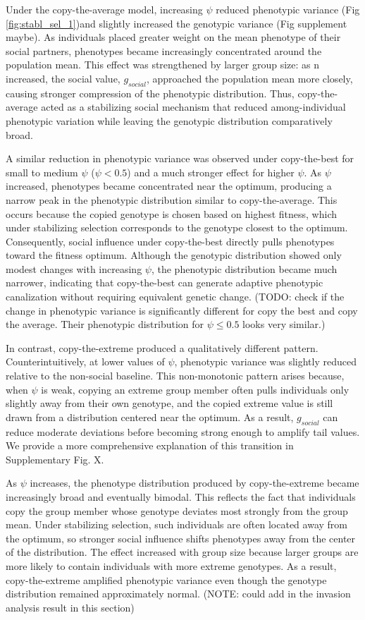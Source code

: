 \documentclass{article}
\begin{document}
Under the copy-the-average model, increasing $\psi$ reduced phenotypic variance (Fig \ref{fig:stabl_sel_1})and slightly increased the genotypic variance (Fig supplement maybe). As individuals placed greater weight on the mean phenotype of their social partners, phenotypes became increasingly concentrated around the population mean. This effect was strengthened by larger group size: as n increased, the social value, $g_{social}$, approached the population mean more closely, causing stronger compression of the phenotypic distribution. Thus, copy-the-average acted as a stabilizing social mechanism that reduced among-individual phenotypic variation while leaving the genotypic distribution comparatively broad.

A similar reduction in phenotypic variance was observed under copy-the-best for small to medium $\psi$ ($\psi < 0.5$) and a much stronger effect for higher $\psi$. As $\psi$ increased, phenotypes became concentrated near the optimum, producing a narrow peak in the phenotypic distribution similar to copy-the-average. This occurs because the copied genotype is chosen based on highest fitness, which under stabilizing selection corresponds to the genotype closest to the optimum. Consequently, social influence under copy-the-best directly pulls phenotypes toward the fitness optimum. Although the genotypic distribution showed only modest changes with increasing $\psi$, the phenotypic distribution became much narrower, indicating that copy-the-best can generate adaptive phenotypic canalization without requiring equivalent genetic change. (TODO: check if the change in phenotypic variance is significantly different for copy the best and copy the average. Their phenotypic distribution for $\psi \leq 0.5$ looks very similar.)

In contrast, copy-the-extreme produced a qualitatively different pattern. Counterintuitively, at lower values of $\psi$, phenotypic variance was slightly reduced relative to the non-social baseline. This non-monotonic pattern arises because, when $\psi$ is weak, copying an extreme group member often pulls individuals only slightly away from their own genotype, and the copied extreme value is still drawn from a distribution centered near the optimum. As a result, $g_{social}$ can reduce moderate deviations before becoming strong enough to amplify tail values. We provide a more comprehensive explanation of this transition in Supplementary Fig. X.

As $\psi$ increases, the phenotype distribution produced by copy-the-extreme became increasingly broad and eventually bimodal. This reflects the fact that individuals copy the group member whose genotype deviates most strongly from the group mean. Under stabilizing selection, such individuals are often located away from the optimum, so stronger social influence shifts phenotypes away from the center of the distribution. The effect increased with group size because larger groups are more likely to contain individuals with more extreme genotypes. As a result, copy-the-extreme amplified phenotypic variance even though the genotype distribution remained approximately normal. (NOTE: could add in the invasion analysis result in this section)
\end{document}
